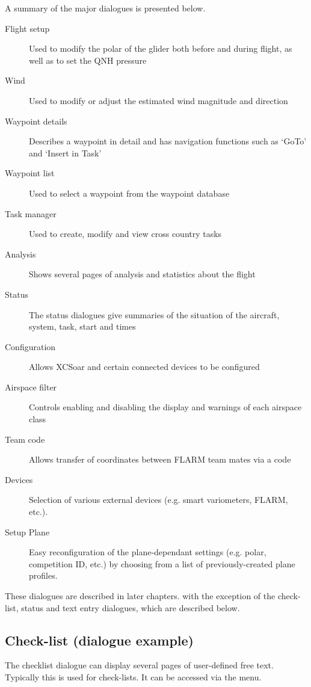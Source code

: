 A summary of the major dialogues is presented below.
\begin{description}
\item[Flight setup] Used to modify the polar of the glider both before and
during flight, as well as to set the QNH pressure
\item[Wind] Used to modify or adjust the estimated wind magnitude and direction
\item[Waypoint details] Describes a waypoint in detail and has navigation
functions such as `GoTo' and `Insert in Task'
\item[Waypoint list] Used to select a waypoint from the waypoint database
\item[Task manager] Used to create, modify and view cross country tasks
\item[Analysis] Shows several pages of analysis and statistics about the flight
\item[Status] The status dialogues give summaries of the situation of the
aircraft, system, task, start and times
\item[Configuration] Allows XCSoar and certain connected devices to be
configured
\item[Airspace filter] Controls enabling and disabling the display and warnings
of each airspace class
\item[Team code] Allows transfer of coordinates between FLARM team mates via a
  code
\item[Devices]  Selection of various external devices (e.g. smart variometers,
  FLARM, etc.).
\item[Setup Plane]  Easy reconfiguration of the plane-dependant settings (e.g.
  polar, competition ID, etc.) by choosing from a list of previously-created
  plane profiles.
\end{description}

These dialogues are described in later chapters. with the exception of the
check-list, status and text entry dialogues, which are described below.


\subsection*{Check-list (dialogue example)}\label{sec:checklist}

The checklist dialogue can display several pages of user-defined free text.
Typically this is used for check-lists. It can be accessed via the menu.
\begin{quote}
\blink{}
\end{quote}

